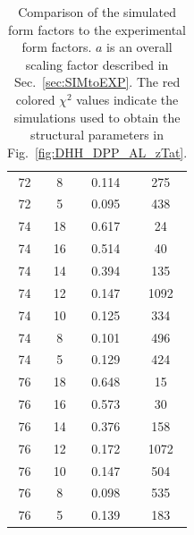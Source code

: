 \begin{table}[p]
\begin{tabular}{c c c c}
    72 & 8  & 0.114 & 275 \\
    72 & 5  & 0.095 & 438 \\
    \hline
    74 & 18 & 0.617 & {\color{red}24}   \\
    74 & 16 & 0.514 & {\color{red}40}   \\
    74 & 14 & 0.394 & 135  \\
    74 & 12 & 0.147	& 1092 \\
    74 & 10 & 0.125 & 334  \\
    74 & 8  & 0.101 & 496  \\
    74 & 5  & 0.129 & 424  \\
    \hline
    76 & 18 & 0.648 & {\color{red}15}   \\
    76 & 16 & 0.573	& {\color{red}30}   \\
    76 & 14 & 0.376 & 158  \\
    76 & 12 & 0.172 & 1072 \\
    76 & 10 & 0.147 & 504  \\
    76 & 8  & 0.098 & 535  \\
    76 & 5  & 0.139 & 183  \\
    \hline
  \end{tabular}
  \caption[Comparison of the simulated form factors to the 
  experimental form factors]
  {Comparison of the simulated form factors to the 
  experimental form factors. $a$ is an overall scaling factor described in
  Sec.~\ref{sec:SIMtoEXP}. The red colored $\chi^2$ values indicate the simulations
  used to obtain the structural parameters in Fig.~\ref{fig:DHH_DPP_AL_zTat}.}
  \label{tab:MD_sim-exp}
\end{table}

